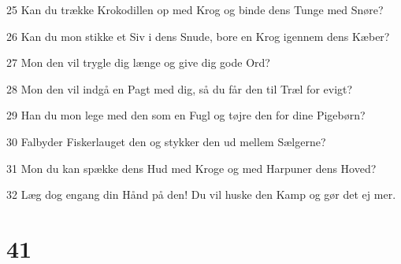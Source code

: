\par 25 Kan du trække Krokodillen op med Krog og binde dens Tunge med Snøre?
\par 26 Kan du mon stikke et Siv i dens Snude, bore en Krog igennem dens Kæber?
\par 27 Mon den vil trygle dig længe og give dig gode Ord?
\par 28 Mon den vil indgå en Pagt med dig, så du får den til Træl for evigt?
\par 29 Han du mon lege med den som en Fugl og tøjre den for dine Pigebørn?
\par 30 Falbyder Fiskerlauget den og stykker den ud mellem Sælgerne?
\par 31 Mon du kan spække dens Hud med Kroge og med Harpuner dens Hoved?
\par 32 Læg dog engang din Hånd på den! Du vil huske den Kamp og gør det ej mer.

\chapter{41}

